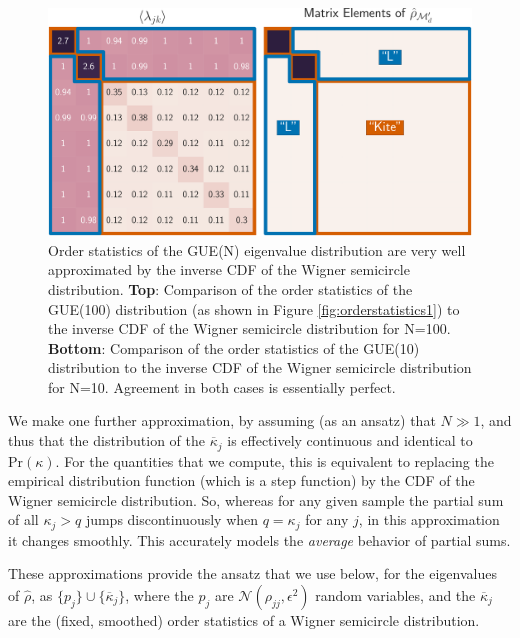 \documentclass[aps,pra, twocolumn]{revtex4}
\begin{document}
\begin{figure}[h!]
\includegraphics[width=\columnwidth]{Images/Figure_6.pdf}
\caption{Order statistics of the GUE(N) eigenvalue distribution are very well approximated by the inverse CDF of the Wigner semicircle distribution.  \textbf{Top}:  Comparison of the order statistics of the GUE(100) distribution (as shown in Figure \ref{fig:orderstatistics1}) to the inverse CDF of the Wigner semicircle distribution for N=100.  \textbf{Bottom}:  Comparison of the order statistics of the GUE(10) distribution to the inverse CDF of the Wigner semicircle distribution for N=10.  Agreement in both cases is essentially perfect.}
\label{fig:orderstatistics2}
\end{figure}

We make one further approximation, by assuming (as an ansatz) that $N\gg1$, and thus that the distribution of the $\overline{\kappa}_j$ is effectively continuous and identical to $\mathrm{Pr}(\kappa)$. For the quantities that we compute, this is equivalent to replacing the empirical distribution function (which is a step function) by the CDF of the Wigner semicircle distribution.  So, whereas for any given sample the partial sum of all $\kappa_j > q$ jumps discontinuously when $q=\kappa_j$ for any $j$, in this approximation it changes smoothly.  This accurately models the \emph{average} behavior of partial sums.

These approximations provide the ansatz that we use below, for the eigenvalues of $\hat\rho$, as $\{p_j\} \cup \{\overline{\kappa}_j\}$, where the $p_j$ are $\mathcal{N}(\rho_{jj},\epsilon^2)$ random variables, and the $\overline{\kappa}_j$ are the (fixed, smoothed) order statistics of a Wigner semicircle distribution.  
\end{document}
